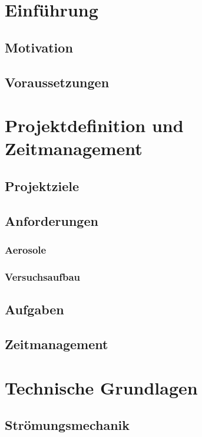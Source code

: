 \chapter{Einf\"{u}hrung}
\section{Motivation}
\section{Voraussetzungen}


\chapter{Projektdefinition und Zeitmanagement}\label{ch:foundations}
\section{Projektziele}
\section{Anforderungen}
\subsection{Aerosole}
\subsection{Versuchsaufbau}
\section{Aufgaben}
\section{Zeitmanagement}

\chapter{Technische Grundlagen}\label{ch:foundations}
\section{Str\"{o}mungsmechanik}
